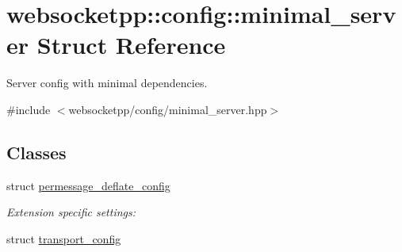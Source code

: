 \hypertarget{structwebsocketpp_1_1config_1_1minimal__server}{}\section{websocketpp\+:\+:config\+:\+:minimal\+\_\+server Struct Reference}
\label{structwebsocketpp_1_1config_1_1minimal__server}


Server config with minimal dependencies.  




{\ttfamily \#include $<$websocketpp/config/minimal\+\_\+server.\+hpp$>$}

\subsection*{Classes}
\begin{DoxyCompactItemize}
\item 
struct \hyperlink{structwebsocketpp_1_1config_1_1minimal__server_1_1permessage__deflate__config}{permessage\+\_\+deflate\+\_\+config}
\begin{DoxyCompactList}\small\item\em Extension specific settings\+: \end{DoxyCompactList}\item 
struct \hyperlink{structwebsocketpp_1_1config_1_1minimal__server_1_1transport__config}{transport\+\_\+config}
\end{DoxyCompactItemize}
